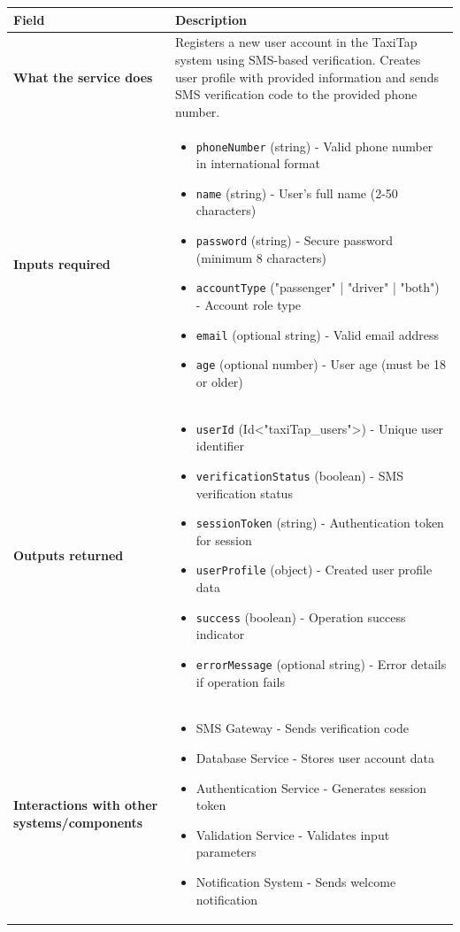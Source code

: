 \documentclass[11pt,a4paper]{article}
\begin{document}
\begin{longtable}{|p{3cm}|p{12cm}|}
\hline
\textbf{Field} & \textbf{Description} \\
\hline
\textbf{What the service does} & 
Registers a new user account in the TaxiTap system using SMS-based verification. Creates user profile with provided information and sends SMS verification code to the provided phone number. \\
\hline
\textbf{Inputs required} & 
\begin{itemize}[nosep]
\item \texttt{phoneNumber} (string) - Valid phone number in international format
\item \texttt{name} (string) - User's full name (2-50 characters)
\item \texttt{password} (string) - Secure password (minimum 8 characters)
\item \texttt{accountType} ("passenger" | "driver" | "both") - Account role type
\item \texttt{email} (optional string) - Valid email address
\item \texttt{age} (optional number) - User age (must be 18 or older)
\end{itemize} \\
\hline
\textbf{Outputs returned} & 
\begin{itemize}[nosep]
\item \texttt{userId} (Id<"taxiTap\_users">) - Unique user identifier
\item \texttt{verificationStatus} (boolean) - SMS verification status
\item \texttt{sessionToken} (string) - Authentication token for session
\item \texttt{userProfile} (object) - Created user profile data
\item \texttt{success} (boolean) - Operation success indicator
\item \texttt{errorMessage} (optional string) - Error details if operation fails
\end{itemize} \\
\hline
\textbf{Interactions with other systems/components   } & 
\begin{itemize}[nosep]
\item SMS Gateway - Sends verification code
\item Database Service - Stores user account data
\item Authentication Service - Generates session token
\item Validation Service - Validates input parameters
\item Notification System - Sends welcome notification
\end{itemize} \\
\hline
\end{longtable}
\end{document}
